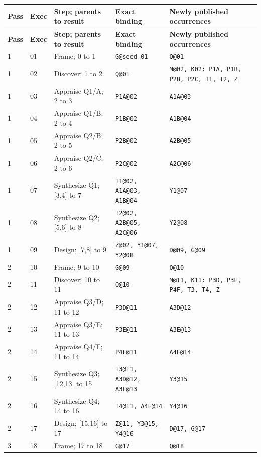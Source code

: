 \documentclass[11pt]{article}
\begin{document}
{\tiny
\begin{longtable}{@{}L{0.28in}L{0.48in}L{1.42in}L{1.45in}L{2.16in}@{}}
\toprule
\textbf{Pass} & \textbf{Exec} & \textbf{Step; parents to result} & \textbf{Exact binding} & \textbf{Newly published occurrences} \\
\midrule
\endfirsthead
\toprule
\textbf{Pass} & \textbf{Exec} & \textbf{Step; parents to result} & \textbf{Exact binding} & \textbf{Newly published occurrences} \\
\midrule
{} & 01 & Frame; 0 to 1 & \texttt{G@seed-01} & \texttt{Q@01} \\
1 & 02 & Discover; 1 to 2 & \texttt{Q@01} & \texttt{M@02, K02: P1A, P1B, P2B, P2C, T1, T2, Z} \\
1 & 03 & Appraise Q1/A; 2 to 3 & \texttt{P1A@02} & \texttt{A1A@03} \\
1 & 04 & Appraise Q1/B; 2 to 4 & \texttt{P1B@02} & \texttt{A1B@04} \\
1 & 05 & Appraise Q2/B; 2 to 5 & \texttt{P2B@02} & \texttt{A2B@05} \\
1 & 06 & Appraise Q2/C; 2 to 6 & \texttt{P2C@02} & \texttt{A2C@06} \\
1 & 07 & Synthesize Q1; [3,4] to 7 & \texttt{T1@02, A1A@03, A1B@04} & \texttt{Y1@07} \\
1 & 08 & Synthesize Q2; [5,6] to 8 & \texttt{T2@02, A2B@05, A2C@06} & \texttt{Y2@08} \\
1 & 09 & Design; [7,8] to 9 & \texttt{Z@02, Y1@07, Y2@08} & \texttt{D@09, G@09} \\
2 & 10 & Frame; 9 to 10 & \texttt{G@09} & \texttt{Q@10} \\
2 & 11 & Discover; 10 to 11 & \texttt{Q@10} & \texttt{M@11, K11: P3D, P3E, P4F, T3, T4, Z} \\
2 & 12 & Appraise Q3/D; 11 to 12 & \texttt{P3D@11} & \texttt{A3D@12} \\
2 & 13 & Appraise Q3/E; 11 to 13 & \texttt{P3E@11} & \texttt{A3E@13} \\
2 & 14 & Appraise Q4/F; 11 to 14 & \texttt{P4F@11} & \texttt{A4F@14} \\
2 & 15 & Synthesize Q3; [12,13] to 15 & \texttt{T3@11, A3D@12, A3E@13} & \texttt{Y3@15} \\
2 & 16 & Synthesize Q4; 14 to 16 & \texttt{T4@11, A4F@14} & \texttt{Y4@16} \\
2 & 17 & Design; [15,16] to 17 & \texttt{Z@11, Y3@15, Y4@16} & \texttt{D@17, G@17} \\
3 & 18 & Frame; 17 to 18 & \texttt{G@17} & \texttt{Q@18} \\

\end{longtable}}
\end{document}
